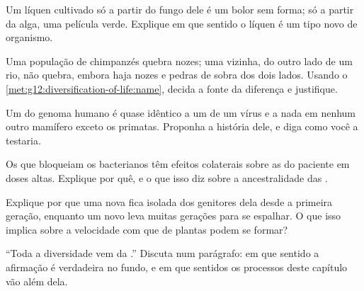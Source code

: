 \begin{exercise}[$\star\star$]\label{exo:g12:diversification-of-life:10}
Um líquen cultivado só a partir do fungo dele é um bolor sem forma; só
a partir da alga, uma película verde. Explique em que sentido o líquen é
um tipo novo de organismo.
\end{exercise}

\begin{exercise}[$\star\star$]\label{exo:g12:diversification-of-life:11}
Uma população de chimpanzés quebra nozes; uma vizinha, do outro lado de
um rio, não quebra, embora haja nozes e pedras de sobra dos dois lados.
Usando o \cref{met:g12:diversification-of-life:name}, decida a fonte da
diferença e justifique.
\end{exercise}

\begin{exercise}[$\star\star\star$]\label{exo:g12:diversification-of-life:12}
Um  do genoma humano é quase idêntico a um  de um vírus e a
nada em nenhum outro mamífero exceto os primatas. Proponha a história
dele, e diga como você a testaria.
\end{exercise}

\begin{exercise}[$\star\star\star$]\label{exo:g12:diversification-of-life:13}
Os  que bloqueiam os  bacterianos têm efeitos
colaterais sobre as  do paciente em doses altas. Explique
por quê, e o que isso diz sobre a ancestralidade das .
\end{exercise}

\begin{exercise}[$\star\star\star$]\label{exo:g12:diversification-of-life:14}
Explique por que uma   nova fica isolada dos genitores
dela desde a primeira geração, enquanto um  novo leva muitas
gerações para se espalhar. O que isso implica sobre a velocidade com
que  de plantas podem se formar?
\end{exercise}

\begin{exercise}[$\star\star\star$]\label{exo:g12:diversification-of-life:15}
``Toda a diversidade vem da .'' Discuta num parágrafo: em que
sentido a afirmação é verdadeira no fundo, e em que sentidos os
processos deste capítulo vão além dela.
\end{exercise}

